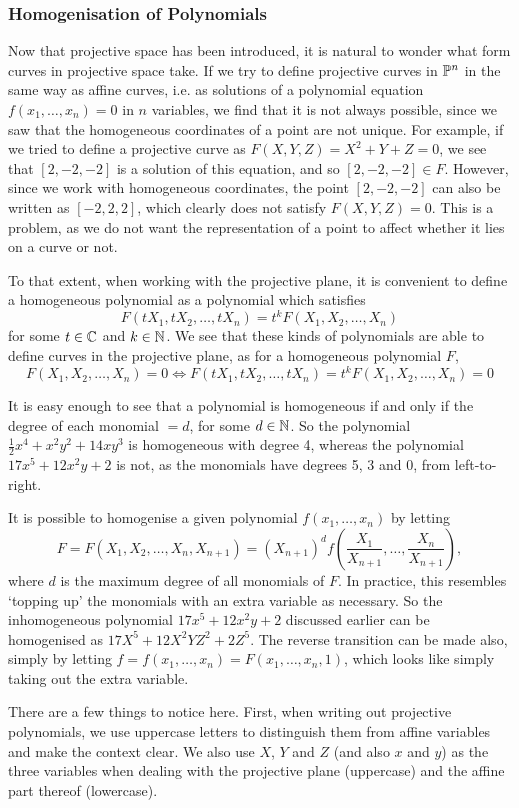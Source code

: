 \subsubsection{Homogenisation of Polynomials}
Now that projective space has been introduced, it is natural to wonder what form curves in projective space take.
If we try to define projective curves in $\mathbb{P}^{n}$ in the same way as affine curves, i.e. as solutions of a polynomial equation $f(x_1,\ldots,x_n)=0$ in $n$ variables, we find that it is not always possible, since we saw that the homogeneous coordinates of a point are not unique.
For example, if we tried to define a projective curve as $F(X,Y,Z)=X^2+Y+Z=0$, we see that $[2,-2,-2]$ is a solution of this equation, and so $[2,-2,-2] \in F$.
However, since we work with homogeneous coordinates, the point $[2,-2,-2]$ can also be written as $[-2,2,2]$, which clearly does not satisfy $F(X,Y,Z)=0$.
This is a problem, as we do not want the representation of a point to affect whether it lies on a curve or not.

To that extent, when working with the projective plane, it is convenient to define a homogeneous polynomial as a polynomial which satisfies
$$F(tX_1,tX_2,\ldots,tX_n)=t^k F(X_1,X_2,\ldots,X_n)$$
for some $t \in \mathbb{C}$ and $k \in \mathbb{N}$. We see that these kinds of polynomials are able to define curves in the projective plane, as for a homogeneous polynomial $F$,
$$F(X_1,X_2,\ldots,X_n)=0 \Leftrightarrow F(tX_1,tX_2,\ldots,tX_n) = t^k F(X_1,X_2,\ldots,X_n) = 0$$

It is easy enough to see that a polynomial is homogeneous if and only if the degree of each monomial $= d$, for some $d \in \mathbb{N}$.
So the polynomial $\frac{1}{2}x^4 + x^2y^2 + 14xy^3$ is homogeneous with degree 4, whereas the polynomial $17x^5 + 12x^2y + 2$ is not, as the monomials have degrees 5, 3 and 0, from left-to-right.

It is possible to homogenise a given polynomial $f(x_1,\ldots,x_n)$ by letting
$$F = F(X_1,X_2,\ldots,X_n,X_{n+1}) = (X_{n+1})^d f(\frac{X_1}{X_{n+1}},\ldots,\frac{X_n}{X_{n+1}}),$$
where $d$ is the maximum degree of all monomials of $F$.
In practice, this resembles `topping up' the monomials with an extra variable as necessary.
So the inhomogeneous polynomial $17x^5 + 12x^2y + 2$ discussed earlier can be homogenised as $17X^5 + 12X^2YZ^2 + 2Z^5$.
The reverse transition can be made also, simply by letting $f = f(x_1,\ldots,x_n) = F(x_1,\ldots,x_n,1)$, which looks like simply taking out the extra variable.

There are a few things to notice here.
First, when writing out projective polynomials, we use uppercase letters to distinguish them from affine variables and make the context clear.
We also use $X$, $Y$ and $Z$ (and also $x$ and $y$) as the three variables when dealing with the projective plane (uppercase) and the affine part thereof (lowercase).

